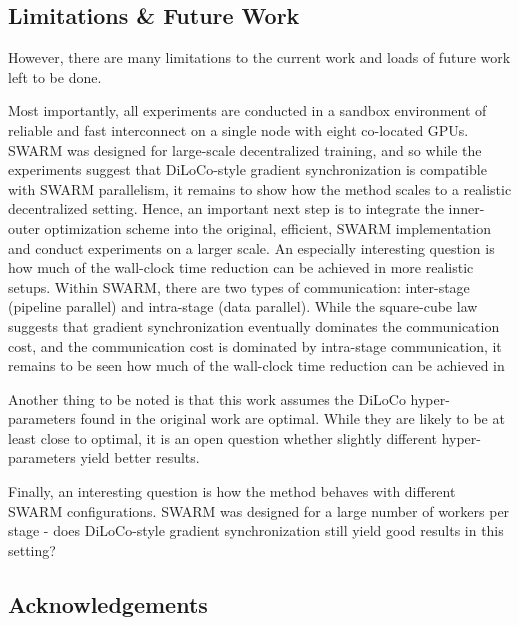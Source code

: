 \documentclass[conference, 10pt]{IEEEtran}
\begin{document}
\subsection{Limitations \& Future Work}

However, there are many limitations to the current work and loads of future work 
left to be done.

Most importantly, all experiments are conducted in a sandbox environment of
reliable and fast interconnect on a single node with eight co-located GPUs.
SWARM was designed for large-scale decentralized training, and so while the 
experiments suggest that DiLoCo-style gradient synchronization is compatible
with SWARM parallelism, it remains to show how the method scales to a realistic
decentralized setting. Hence, an important next step is to integrate the
inner-outer optimization scheme into the original, efficient, SWARM
implementation and conduct experiments on a larger scale. An especially
interesting question is how much of the wall-clock time reduction can be
achieved in more realistic setups.  Within SWARM, there are two types of
communication: inter-stage (pipeline parallel) and intra-stage (data parallel).
While the square-cube law~\cite{ryabinin2023} suggests that gradient
synchronization eventually dominates the communication cost, and the
communication cost is dominated by intra-stage communication, it remains to be
seen how much of the wall-clock time reduction can be achieved in


Another thing to be noted is that this work assumes the DiLoCo hyper-parameters
found in the original work are optimal. While they are likely to be at least
close to optimal, it is an open question whether slightly different hyper-parameters
yield better results.

Finally, an interesting question is how the method behaves with different SWARM
configurations. SWARM was designed for a large number of workers per stage -
does DiLoCo-style gradient synchronization still yield good results in this
setting?


\subsection{Acknowledgements}
\end{document}
